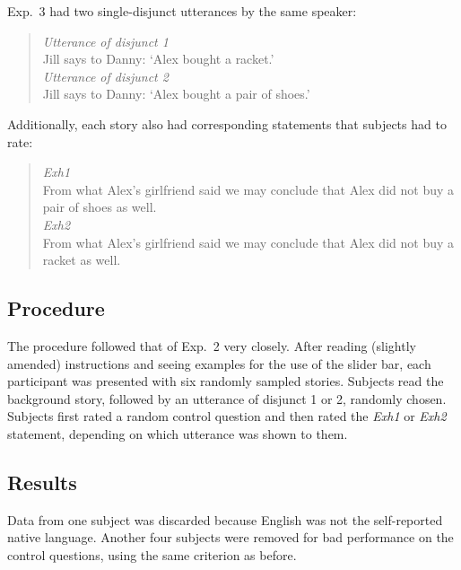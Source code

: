 \documentclass[12pt]{article}
\begin{document}
\noindent Exp.~3 had two single-disjunct utterances by the same speaker:

\begin{quote}
  \emph{Utterance of disjunct 1}\\
  Jill says to Danny: `Alex bought a racket.' \\[.2cm]
  \emph{Utterance of disjunct 2}\\
  Jill says to Danny: `Alex bought a pair of shoes.'
\end{quote}

\noindent Additionally, each story also had corresponding statements that subjects had to
rate:

\begin{quote}
  \emph{Exh1}\\
  From what Alex's girlfriend said we may conclude that Alex did not buy a pair of shoes as well. \\[.2cm]
  \emph{Exh2}\\
  From what Alex's girlfriend said we may conclude that Alex did not buy a racket as well.
\end{quote}

\subsection{Procedure}

The procedure followed that of Exp.~2 very closely. After reading (slightly amended)
instructions and seeing examples for the use of the slider bar, each participant was presented
with six randomly sampled stories. Subjects read the background story, followed by an
utterance of disjunct 1 or 2, randomly chosen. Subjects first rated a random control question
and then rated the \emph{Exh1} or \emph{Exh2} statement, depending on which utterance was shown
to them.

\subsection{Results}

Data from one subject was discarded because English was not the self-reported native
language. Another four subjects were removed for bad performance on the control questions,
using the same criterion as before.
\end{document}
